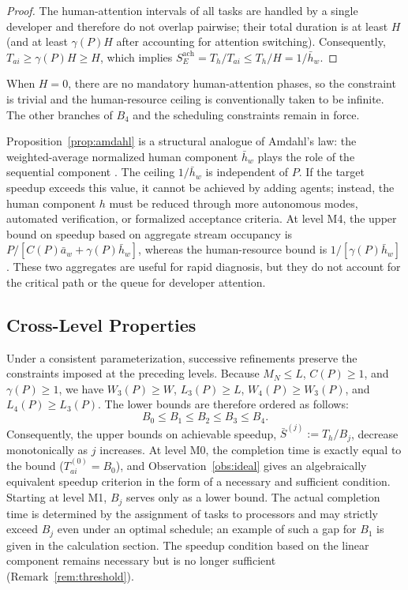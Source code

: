 \begin{proof}
The human-attention intervals of all tasks are handled by a single developer and therefore do not overlap pairwise; their total duration is at least $H$ (and at least $\gamma(P) H$ after accounting for attention switching). Consequently, $T_{ai} \ge \gamma(P) H \ge H$, which implies $S_E^{\mathrm{ach}} = T_h / T_{ai} \le T_h / H = 1/\bar{h}_w$.
\end{proof}

When $H=0$, there are no mandatory human-attention phases, so the constraint is
trivial and the human-resource ceiling is conventionally taken to be infinite.
The other branches of $B_4$ and the scheduling constraints remain in force.

\begin{remark}\label{rem:amdahl-analogy}
Proposition~\ref{prop:amdahl} is a structural analogue of Amdahl's law: the weighted-average normalized human component $\bar{h}_w$ plays the role of the sequential component \cite{amdahl1967validity}. The ceiling $1/\bar{h}_w$ is independent of $P$. If the target speedup exceeds this value, it cannot be achieved by adding agents; instead, the human component $h$ must be reduced through more autonomous modes, automated verification, or formalized acceptance criteria. At level M4, the upper bound on speedup based on aggregate stream occupancy is $P/[C(P)\bar a_w+\gamma(P)\bar h_w]$, whereas the human-resource bound is $1/[\gamma(P)\bar h_w]$. These two aggregates are useful for rapid diagnosis, but they do not account for the critical path or the queue for developer attention.
\end{remark}

\subsection{Cross-Level Properties}

Under a consistent parameterization, successive refinements preserve the
constraints imposed at the preceding levels. Because $M_N\le L$, $C(P)\ge1$, and
$\gamma(P)\ge1$, we have $W_3(P)\ge W$, $L_3(P)\ge L$,
$W_4(P)\ge W_3(P)$, and $L_4(P)\ge L_3(P)$. The lower bounds are therefore
ordered as follows:
\[
  B_0 \le B_1 \le B_2 \le B_3 \le B_4.
\]
Consequently, the upper bounds on achievable speedup, $\bar S^{(j)} := T_h / B_j$, decrease monotonically as $j$ increases. At level M0, the completion time is exactly equal to the bound ($T_{ai}^{(0)} = B_0$), and Observation~\ref{obs:ideal} gives an algebraically equivalent speedup criterion in the form of a necessary and sufficient condition. Starting at level M1, $B_j$ serves only as a lower bound. The actual completion time is determined by the assignment of tasks to processors and may strictly exceed $B_j$ even under an optimal schedule; an example of such a gap for $B_1$ is given in the calculation section. The speedup condition based on the linear component remains necessary but is no longer sufficient (Remark~\ref{rem:threshold}).

